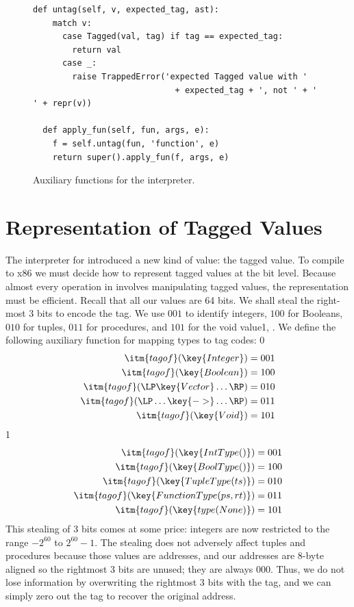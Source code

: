 \documentclass[7x10]{TimesAPriori_MIT}%
\def\racketEd{0}
\def\pythonEd{1}
\def\edition{1}
\newcommand{\pythonColor}[0]{}
\newcommand{\python}[1]{{\if\edition\pythonEd\pythonColor #1\fi}}
\numberwithin{theorem}{chapter}
\numberwithin{definition}{chapter}
\numberwithin{equation}{chapter}
\begin{document}
\begin{figure}[tbp]
\begin{tcolorbox}[colback=white]
{\begin{lstlisting}[basicstyle=\ttfamily\footnotesize]
  def untag(self, v, expected_tag, ast):
    match v:
      case Tagged(val, tag) if tag == expected_tag:
        return val
      case _:
        raise TrappedError('expected Tagged value with '
                             + expected_tag + ', not ' + ' ' + repr(v))

  def apply_fun(self, fun, args, e):
    f = self.untag(fun, 'function', e)
    return super().apply_fun(f, args, e)
\end{lstlisting}
\fi}
  \end{tcolorbox}

  \caption{Auxiliary functions for the \LangDyn{} interpreter.}
\label{fig:interp-Ldyn-aux}
\end{figure}


\section{Representation of Tagged Values}

The interpreter for \LangDyn{} introduced a new kind of value: the
tagged value. To compile \LangDyn{} to x86 we must decide how to
represent tagged values at the bit level. Because almost every
operation in \LangDyn{} involves manipulating tagged values, the
representation must be efficient. Recall that all our values are 64
bits.  We shall steal the right-most $3$ bits to encode the tag.  We use
$001$ to identify integers, $100$ for Booleans, $010$ for tuples,
$011$ for procedures, and $101$ for the void value\python{,
  }. We define the following auxiliary function for mapping
types to tag codes:
%
{\if\edition\racketEd
\begin{align*}
\itm{tagof}(\key{Integer}) &= 001 \\
\itm{tagof}(\key{Boolean}) &= 100 \\
\itm{tagof}(\LP\key{Vector} \ldots\RP) &= 010 \\
\itm{tagof}(\LP\ldots \key{->} \ldots\RP) &= 011 \\
\itm{tagof}(\key{Void}) &= 101
\end{align*}
\fi}
{\if\edition\pythonEd\pythonColor
\begin{align*}
\itm{tagof}(\key{IntType()}) &= 001 \\
\itm{tagof}(\key{BoolType()}) &= 100 \\
\itm{tagof}(\key{TupleType(ts)}) &= 010 \\
\itm{tagof}(\key{FunctionType(ps, rt)}) &= 011 \\
\itm{tagof}(\key{type(None)}) &= 101
\end{align*}
\fi}
%
This stealing of 3 bits comes at some price: integers are now restricted
to the range $-2^{60}$ to $2^{60}-1$. The stealing does not adversely
affect tuples and procedures because those values are addresses, and
our addresses are 8-byte aligned so the rightmost 3 bits are unused;
they are always $000$. Thus, we do not lose information by overwriting
the rightmost 3 bits with the tag, and we can simply zero out the tag
to recover the original address.
\end{document}
